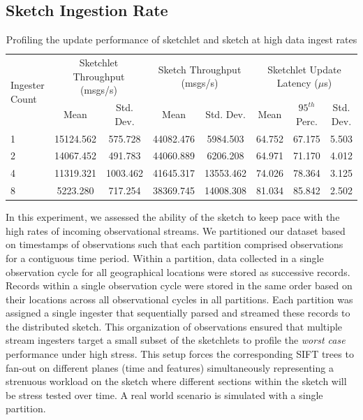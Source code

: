 \subsection{Sketch Ingestion Rate}
%
\begin{table}[bp!]
    \renewcommand{\arraystretch}{1.2}
    \caption{Profiling the update performance of sketchlet and sketch at high data ingest rates}
    \label{tab:throughput}
    \begin{center}
        \begin{tabularx}{0.9\textwidth}{|X|c|c|c|c|c|c|c|}
            \hline
            \multirow{2}{*}{Ingester Count} & \multicolumn{2}{c|}{\cellcolor[gray]{0.7}Sketchlet Throughput (msgs/s)} &\multicolumn{2}{c|}{\cellcolor[gray]{0.7}Sketch Throughput (msgs/s)} & \multicolumn{3}{c|}{\cellcolor[gray]{0.7}Sketchlet Update Latency ($\mu$s)} \\
            \cline{2-5}
             & \cellcolor[gray]{0.9}Mean & \cellcolor[gray]{0.9}Std. Dev.  &  \cellcolor[gray]{0.9}Mean & \cellcolor[gray]{0.9}Std. Dev.
             &  \cellcolor[gray]{0.9}Mean & \cellcolor[gray]{0.9}$95^{th}$ Perc. & \cellcolor[gray]{0.9}Std. Dev. \\
            \hline
            1 & 15124.562 & 575.728 & 44082.476 & 5984.503 & 64.752 & 67.175 & 5.503 \\
            \hline
            2 & 14067.452 & 491.783 & 44060.889 & 6206.208 & 64.971 & 71.170 & 4.012 \\
            \hline
            4 & 11319.321 & 1003.462 & 41645.317 & 13553.462 & 74.026 & 78.364 & 3.125 \\
            \hline
            8 & 5223.280 & 717.254 & 38369.745 & 14008.308 & 81.034 & 85.842 & 2.502 \\
            \hline
        \end{tabularx}
    \end{center}
\end{table}
%
In this experiment, we assessed the ability of the sketch to keep pace with the high rates of incoming observational streams.
We partitioned our dataset based on timestamps of observations such that each partition comprised observations for a contiguous time period.
Within a partition, data collected in a single observation cycle for all geographical locations were stored as successive records.
Records within a single observation cycle were stored in the same order based on their locations across all observational cycles in all partitions.
Each partition was assigned a single ingester that sequentially parsed and streamed these records to the distributed sketch.
This organization of observations ensured that multiple stream ingesters target a small subset of the sketchlets to profile the \textit{worst case} performance under high stress.
This setup forces the corresponding SIFT trees to fan-out on different planes (time and features) simultaneously representing a strenuous workload on the sketch where different sections within the sketch will be stress tested over time.
A real world scenario is simulated with a single partition.

